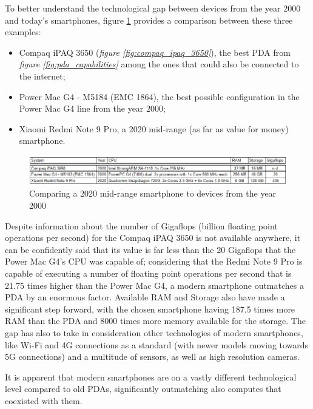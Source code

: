 To better understand the technological gap between devices from the year 2000 and today's smartphones, {figure \ref{fig:three_systems_comparison}} provides a comparison between these three examples:
\begin{itemize}
    \item Compaq iPAQ 3650 (\textit{figure \ref{fig:compaq_ipaq_3650}}), the best PDA from \textit{figure \ref{fig:pda_capabilities}} among the ones that could also be connected to the internet;
    \item Power Mac G4 - M5184 (EMC 1864), the best possible configuration in the Power Mac G4 line from the year 2000;
    \item Xiaomi Redmi Note 9 Pro, a 2020 mid-range (as far as value for money) smartphone.
\end{itemize}
\vspace*{20mm}

\begin{figure}[!ht]
    \centering
    \includegraphics[scale=0.85]{document/chapters/chapter_1/images/three_systems_comparison.png}
    \caption{Comparing a 2020 mid-range smartphone to devices from the year 2000}
    \label{fig:three_systems_comparison}
\end{figure}

Despite information about the number of Gigaflops (billion floating point operations per second) for the Compaq iPAQ 3650 is not available anywhere, it can be confidently said that its value is far less than the 20 Gigaflops that the Power Mac G4's CPU was capable of; considering that the Redmi Note 9 Pro is capable of executing a number of floating point operations per second that is 21.75 times higher than the Power Mac G4, a modern smartphone outmatches a PDA by an enormous factor. Available RAM and Storage also have made a significant step forward, with the chosen smartphone having 187.5 times more RAM than the PDA and 8000 times more memory available for the storage. The gap has also to take in consideration other technologies of modern smartphones, like Wi-Fi and 4G connections as a standard (with newer models moving towards 5G connections) and a multitude of sensors, as well as high resolution cameras. 

It is apparent that modern smartphones are on a vastly different technological level compared to old PDAs, significantly outmatching also computes that coexisted with them.
